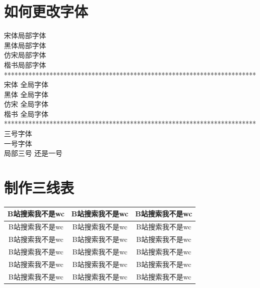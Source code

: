 \documentclass{article}
\begin{document}
\section{如何更改字体}
{\songti    宋体}局部字体\\
{\heiti     黑体}局部字体\\
{\fangsong  仿宋}局部字体\\
{\kaishu    楷书}局部字体\\
************************************************************************\\
\songti    宋体  全局字体\\
\heiti     黑体  全局字体\\
\fangsong  仿宋  全局字体\\
\kaishu    楷书  全局字体\\
************************************************************************\\
   三号字体\\
   一号字体\\
{  局部三号} 还是一号\\
\newpage
\section{制作三线表}
\begin{center}
\begin{tabular}{ccc}
    \toprule
    B站搜索我不是wc&B站搜索我不是wc&B站搜索我不是wc\\
    \midrule
    B站搜索我不是wc&B站搜索我不是wc&B站搜索我不是wc\\
    B站搜索我不是wc&B站搜索我不是wc&B站搜索我不是wc\\
    B站搜索我不是wc&B站搜索我不是wc&B站搜索我不是wc\\
    B站搜索我不是wc&B站搜索我不是wc&B站搜索我不是wc\\
    B站搜索我不是wc&B站搜索我不是wc&B站搜索我不是wc\\
    \bottomrule
\end{tabular}
\end{center}
\newpage
\end{document}
